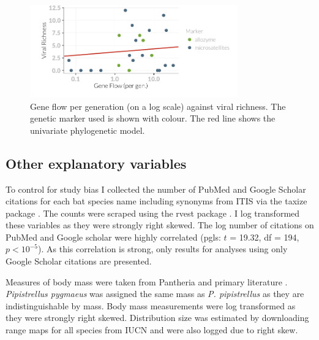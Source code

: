 \begin{knitrout}\footnotesize
{}\color{fgcolor}\begin{figure}[t]

{\centering \includegraphics[width=0.8\textwidth]{figure/fstRawData-1} 

}

\caption[Gene flow per generation (on a log scale) against viral richness]{Gene flow per generation (on a log scale) against viral richness. The genetic marker used is shown with colour. The red line shows the univariate phylogenetic model.}\label{fig:fstRawData}
\end{figure}


\end{knitrout}



\subsection{Other explanatory variables}

To control for study bias I collected the number of PubMed and Google Scholar citations for each bat species name including synonyms from ITIS \cite{itis} via the taxize package \cite{chamberlain2013taxize}.
The counts were scraped using the rvest package \cite{rvest}.
I log transformed these variables as they were strongly right skewed.
The log number of citations on PubMed and Google scholar were highly correlated (pgls: $t$ = 19.32, df = 194, $p < 10^{-5}$).
As this correlation is strong, only results for analyses using only Google Scholar citations are presented.

Measures of body mass were taken from Pantheria \cite{jones2009pantheria} and primary literature \cite{canals2005relative, arita1993rarity, lopez2014echolocation, orr2013does, lim2001bat, aldridge1987turning, ma2003dietary, owen2003home, henderson2008movements, heaney2012nyctalus, oleksy2015high, zhang2009recent}. 
\emph{Pipistrellus pygmaeus} was assigned the same mass as \emph{P. pipistrellus} as they are indistinguishable by mass.
Body mass measurements were log transformed as they were strongly right skewed.
Distribution size was estimated by downloading range maps for all species from IUCN \cite{iucn} and were also logged due to right skew.



